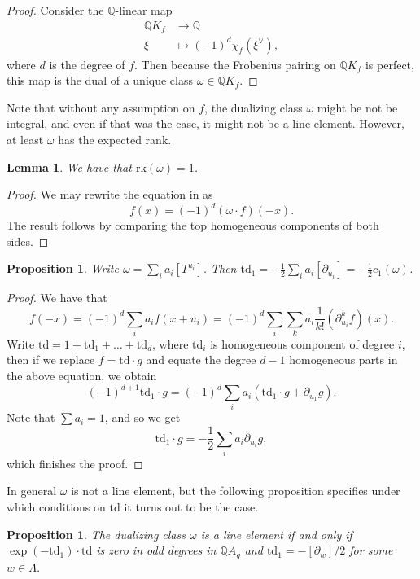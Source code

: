 \documentclass[oneside]{amsart}
\theoremstyle{plain}
\newtheorem{lemma}[theorem]{Lemma}
\newtheorem{proposition}[theorem]{Proposition}
\theoremstyle{definition}
\newcommand{\Q}{{\mathbb{Q}}}
\newcommand{\rk}{{\mathrm{rk}}}
\newcommand{\td}{{\mathrm{td}}}
\begin{document}
\begin{proof}
    Consider the $\Q$-linear map
    \begin{align*}
        \Q K_f &\to \Q\\
        \xi &\mapsto (-1)^d \chi_f(\xi^\vee),
    \end{align*}
    where $d$ is the degree of $f$.
    Then because the Frobenius pairing on $\Q K_f$ is perfect, this map is the dual of a unique class $\omega \in \Q K_f$.
\end{proof}

Note that without any assumption on $f$, the dualizing class $\omega$ might be not be integral, and even if that was the case, it might not be a line element. However, at least $\omega$ has the expected rank.

\begin{lemma}
    We have that $\rk(\omega) = 1$.
\end{lemma}
\begin{proof}
    We may rewrite the equation in  as
    \[f(x) = (-1)^d (\omega \cdot f)(-x).\]
    The result follows by comparing the top homogeneous components of both sides.
\end{proof}

\begin{proposition}
    Write $\omega = \sum_{i} a_i [T^{u_i}]$.
    Then $\td_1 = -\frac{1}{2}\sum_{i}a_i[\partial_{u_i}] = -\frac{1}{2}c_1(\omega)$.
\end{proposition}

\begin{proof}
    We have that
    \[
        f(-x) = (-1)^d\sum_i a_i f(x + u_i)
        = (-1)^d\sum_i\sum_{k} a_i\frac{1}{k!}(\partial_{u_i}^kf)(x).
    \]
    Write $\td = 1 + \td_1 + \dots + \td_d$, where $\td_i$ is homogeneous component of degree $i$, then if we replace $f = \td \cdot g$ and equate the degree $d-1$ homogeneous parts in the above equation, we obtain 
    \[
        (-1)^{d+1}\td_1\cdot g = (-1)^d\sum_i a_i (\td_1 \cdot g + \partial_{u_1} g).
    \]
    Note that $\sum a_i = 1$, and so we get
    \[\td_1 \cdot g = -\frac{1}{2}\sum_i a_i \partial_{u_i} g,\]
    which finishes the proof.
\end{proof}

In general $\omega$ is not a line element, but the following proposition specifies under which conditions on $\td$ it turns out to be the case.

\begin{proposition}\label{prop:dualizing-class-characterization}
    The dualizing class $\omega$ is a line element if and only if $\exp(-\td_1) \cdot \td$ is zero in odd degrees in $\Q A_g$ and $\td_1 = -[\partial_w]/2$ for some $w\in \Lambda$.
\end{proposition}
\end{document}

